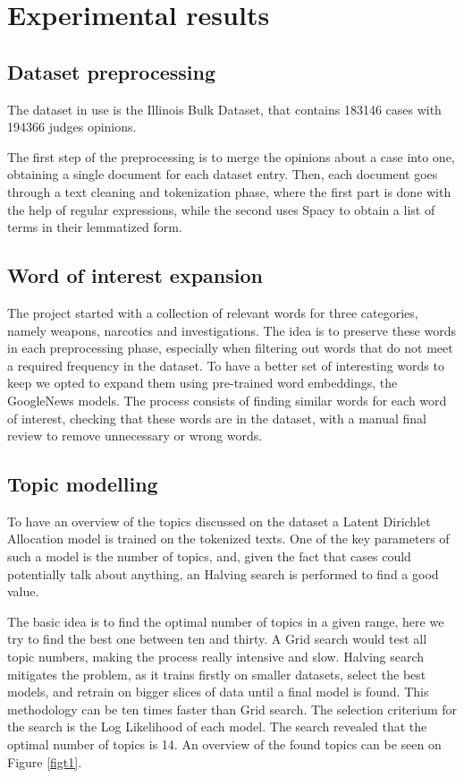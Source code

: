 \section{Experimental results}

\subsection{Dataset preprocessing}

The dataset in use is the Illinois Bulk Dataset, that contains 
183146 cases with 194366 judges opinions. 

The first step of the preprocessing is to merge the opinions about a 
case into one, obtaining a single document for each dataset entry.  
Then, each document goes through a text cleaning and tokenization phase, 
where the first part is done with the help of regular expressions, 
while the second uses Spacy to obtain a list of terms in their lemmatized form.

\subsection{Word of interest expansion}

The project started with a collection of relevant words for three categories, 
namely weapons, narcotics and investigations. The idea is to preserve these words
in each preprocessing phase, especially when filtering out words 
that do not meet a required frequency in the dataset. 
To have a better set of interesting words to keep we opted to expand them 
using pre-trained word embeddings, the GoogleNews models.
The process consists of finding similar words for each word 
of interest, checking that these words are in the dataset, 
with a manual final review to remove unnecessary or wrong words.

\subsection{Topic modelling}

To have an overview of the topics discussed on the dataset a Latent 
Dirichlet Allocation model is trained on the tokenized texts.
One of the key parameters of such a model is the number of topics, and, 
given the fact that cases could potentially talk about anything, an 
Halving search is performed to find a good value.

\noindent The basic idea is to find the optimal number of topics in a given range, 
here we try to find the best one between ten and thirty. A Grid search would 
test all topic numbers, making the process really intensive and slow. 
Halving search 
mitigates the problem, as it trains firstly on smaller datasets, select 
the best models, and retrain on bigger slices of data until a final model 
is found. This methodology can be ten times faster than Grid search. 
The selection criterium for the search is the Log Likelihood of each model.
The search revealed that the optimal number of topics is 14. An overview of the found topics 
can be seen on Figure \vref{figt1}.

